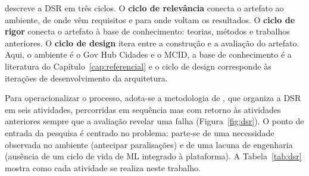  descreve a DSR em três ciclos. O \textbf{ciclo de relevância} conecta o artefato ao ambiente, de onde vêm requisitos e para onde voltam os resultados. O \textbf{ciclo de rigor} conecta o artefato à base de conhecimento: teorias, métodos e trabalhos anteriores. O \textbf{ciclo de design} itera entre a construção e a avaliação do artefato. Aqui, o ambiente é o Gov Hub Cidades e o MCID, a base de conhecimento é a literatura do Capítulo~\ref{cap:referencial} e o ciclo de design corresponde às iterações de desenvolvimento da arquitetura.

Para operacionalizar o processo, adota-se a metodologia de , que organiza a DSR em seis atividades, percorridas em sequência mas com retorno às atividades anteriores sempre que a avaliação revelar uma falha (Figura~\ref{fig:dsr}). O ponto de entrada da pesquisa é centrado no problema: parte-se de uma necessidade observada no ambiente (antecipar paralisações) e de uma lacuna de engenharia (ausência de um ciclo de vida de ML integrado à plataforma). A Tabela~\ref{tab:dsr} mostra como cada atividade se realiza neste trabalho.

